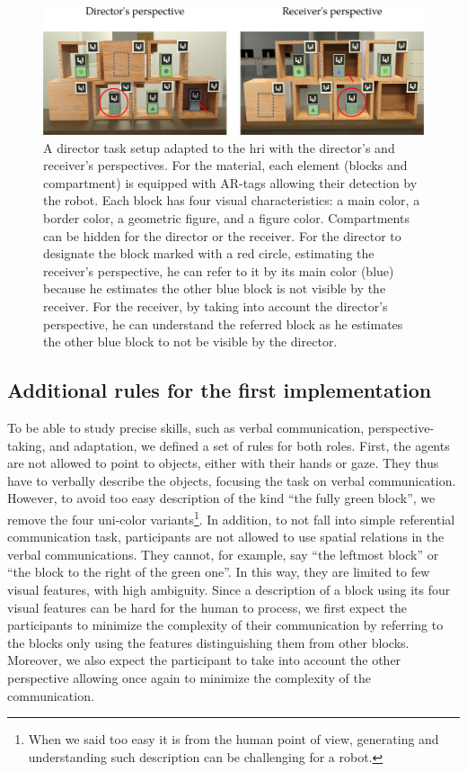 \begin{figure}[ht!]
\centering
\includegraphics[width=\textwidth]{figures/chapter9/setup.png}
\caption{\label{fig:chap9_setup} A director task setup adapted to the \acrshort{hri} with the director's and receiver's perspectives. For the material, each element (blocks and compartment) is equipped with AR-tags allowing their detection by the robot. Each block has four visual characteristics: a main color, a border color, a geometric figure, and a figure color. Compartments can be hidden for the director or the receiver. For the director to designate the block marked with a red circle, estimating the receiver's perspective, he can refer to it by its main color (blue) because he estimates the other blue block is not visible by the receiver. For the receiver, by taking into account the director's perspective, he can understand the referred block as he estimates the other blue block to not be visible by the director.}
\end{figure}

\subsection{Additional rules for the first implementation}

To be able to study precise skills, such as verbal communication, perspective-taking, and adaptation, we defined a set of rules for both roles. First, the agents are not allowed to point to objects, either with their hands or gaze. They thus have to verbally describe the objects, focusing the task on verbal communication. However, to avoid too easy description of the kind ``the fully green block'', we remove the four uni-color variants\footnote{When we said too easy it is from the human point of view, generating and understanding such description can be challenging for a robot.}. In addition, to not fall into simple referential communication task, participants are not allowed to use spatial relations in the verbal communications. They cannot, for example, say ``the leftmost block'' or ``the block to the right of the green one''. In this way, they are limited to few visual features, with high ambiguity. Since a description of a block using its four visual features can be hard for the human to process, we first expect the participants to minimize the complexity of their communication by referring to the blocks only using the features distinguishing them from other blocks. Moreover, we also expect the participant to take into account the other perspective allowing once again to minimize the complexity of the communication.

